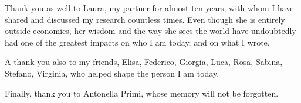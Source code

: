 Thank you as well to Laura, my partner for almost ten years, with whom I have shared and discussed my research countless times. Even though she is entirely outside economics, her wisdom and the way she sees the world have undoubtedly had one of the greatest impacts on who I am today, and on what I wrote.

A thank you also to my friends, Elisa, Federico, Giorgia, Luca, Rosa, Sabina, Stefano, Virginia, who helped shape the person I am today.

Finally, thank you to Antonella Primi, whose memory will not be forgotten.

\endgroup
